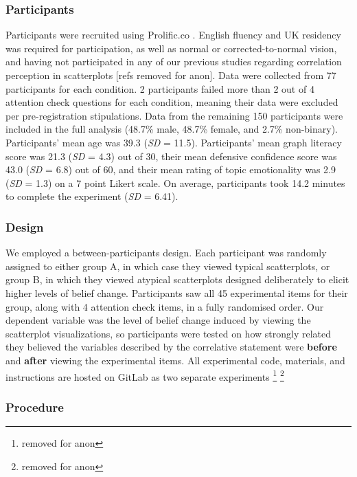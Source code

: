 \documentclass[manuscript,screen,review,anonymous]{acmart}
\begin{document}
\subsubsection{Participants}\label{sec-participants-main}

Participants were recruited using Prolific.co \citep{prolific}. English
fluency and UK residency was required for participation, as well as
normal or corrected-to-normal vision, and having not participated in any
of our previous studies regarding correlation perception in scatterplots
{[}refs removed for anon{]}. Data were collected from 77 participants
for each condition. 2 participants failed more than 2 out of 4 attention
check questions for each condition, meaning their data were excluded per
pre-registration stipulations. Data from the remaining 150 participants
were included in the full analysis (48.7\% male, 48.7\% female, and
2.7\% non-binary). Participants' mean age was 39.3 (\emph{SD} = 11.5).
Participants' mean graph literacy score was 21.3 (\emph{SD} = 4.3) out
of 30, their mean defensive confidence score was 43.0 (\emph{SD} = 6.8)
out of 60, and their mean rating of topic emotionality was 2.9
(\emph{SD} = 1.3) on a 7 point Likert scale. On average, participants
took 14.2 minutes to complete the experiment (\emph{SD} = 6.41).

\subsubsection{Design}\label{sec-design-main}

We employed a between-participants design. Each participant was randomly
assigned to either group A, in which case they viewed typical
scatterplots, or group B, in which they viewed atypical scatterplots
designed deliberately to elicit higher levels of belief change.
Participants saw all 45 experimental items for their group, along with 4
attention check items, in a fully randomised order. Our dependent
variable was the level of belief change induced by viewing the
scatterplot visualizations, so participants were tested on how strongly
related they believed the variables described by the correlative
statement were \textbf{before} and \textbf{after} viewing the
experimental items. All experimental code, materials, and instructions
are hosted on GitLab as two separate experiments \footnote{removed for
  anon} \footnote{removed for anon}

\subsubsection{Procedure}\label{sec-procedure-main}
\end{document}
